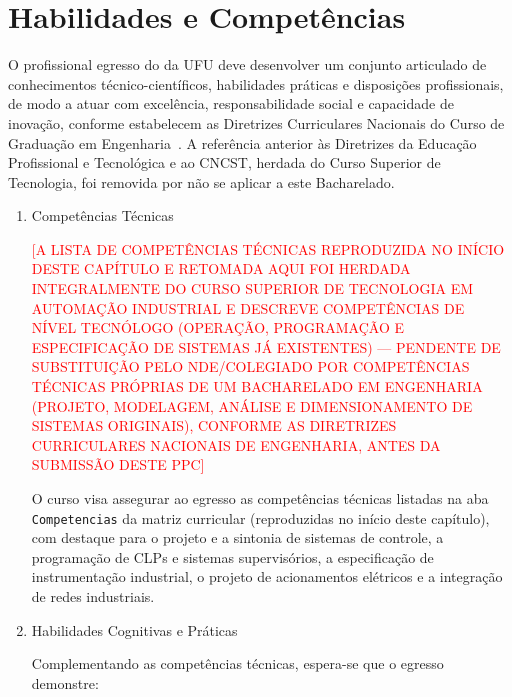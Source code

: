 \section{Habilidades e Competências}

O profissional egresso do \ppccurso da UFU deve desenvolver um conjunto articulado de conhecimentos técnico-científicos, habilidades práticas e disposições profissionais, de modo a atuar com excelência, responsabilidade social e capacidade de inovação, conforme estabelecem as Diretrizes Curriculares Nacionais do Curso de Graduação em Engenharia~\cite{cne_ces_2_2019,cne_ces_1_2021}. A referência anterior às Diretrizes da Educação Profissional e Tecnológica e ao CNCST, herdada do Curso Superior de Tecnologia, foi removida por não se aplicar a este Bacharelado.

\begin{enumerate}[label=\Roman*.]
\item Competências Técnicas

\textcolor{red}{[A LISTA DE COMPETÊNCIAS TÉCNICAS REPRODUZIDA NO INÍCIO DESTE CAPÍTULO E RETOMADA AQUI FOI HERDADA INTEGRALMENTE DO CURSO SUPERIOR DE TECNOLOGIA EM AUTOMAÇÃO INDUSTRIAL E DESCREVE COMPETÊNCIAS DE NÍVEL TECNÓLOGO (OPERAÇÃO, PROGRAMAÇÃO E ESPECIFICAÇÃO DE SISTEMAS JÁ EXISTENTES) — PENDENTE DE SUBSTITUIÇÃO PELO NDE/COLEGIADO POR COMPETÊNCIAS TÉCNICAS PRÓPRIAS DE UM BACHARELADO EM ENGENHARIA (PROJETO, MODELAGEM, ANÁLISE E DIMENSIONAMENTO DE SISTEMAS ORIGINAIS), CONFORME AS DIRETRIZES CURRICULARES NACIONAIS DE ENGENHARIA, ANTES DA SUBMISSÃO DESTE PPC]}

O curso visa assegurar ao egresso as competências técnicas listadas na aba \texttt{Competencias} da matriz curricular (reproduzidas no início deste capítulo), com destaque para o projeto e a sintonia de sistemas de controle, a programação de CLPs e sistemas supervisórios, a especificação de instrumentação industrial, o projeto de acionamentos elétricos e a integração de redes industriais.

\item Habilidades Cognitivas e Práticas

Complementando as competências técnicas, espera-se que o egresso demonstre:


\end{enumerate}
